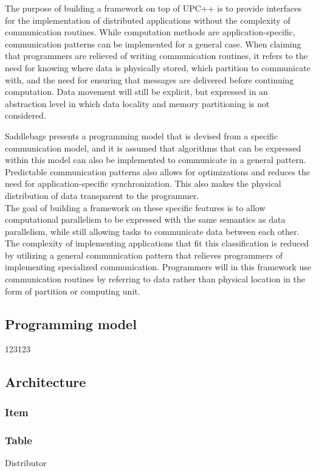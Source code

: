 \documentclass{uit-report}
\begin{document}
The purpose of building a framework on top of UPC++ is to provide interfaces for the implementation of distributed applications without the complexity of communication routines. While computation methods are application-specific, communication patterns can be implemented for a general case. When claiming that programmers are relieved of writing communication routines, it refers to the need for knowing where data is physically stored, which partition to communicate with, and the need for ensuring that messages are delivered before continuing computation. Data movement will still be explicit, but expressed in an abstraction level in which data locality and memory partitioning is not considered.

Saddlebags presents a programming model that is devised from a specific communication model, and it is assumed that algorithms that can be expressed within this model can also be implemented to communicate in a general pattern. Predictable communication patterns also allows for optimizations and reduces the need for application-specific synchronization. This also makes the physical distribution of data transparent to the programmer.
\\

The goal of building a framework on these specific features is to allow computational parallelism to be expressed with the same semantics as data parallelism, while still allowing tasks to communicate data between each other. The complexity of implementing applications that fit this classification is reduced by utilizing a general communication pattern that relieves programmers of implementing specialized communication. Programmers will in this framework use communication routines by referring to data rather than physical location in the form of partition or computing unit.

\subsection{Programming model}
123123
\subsection{Architecture}
\subsubsection{Item}
\subsubsection{Table}
Distributor
\end{document}
